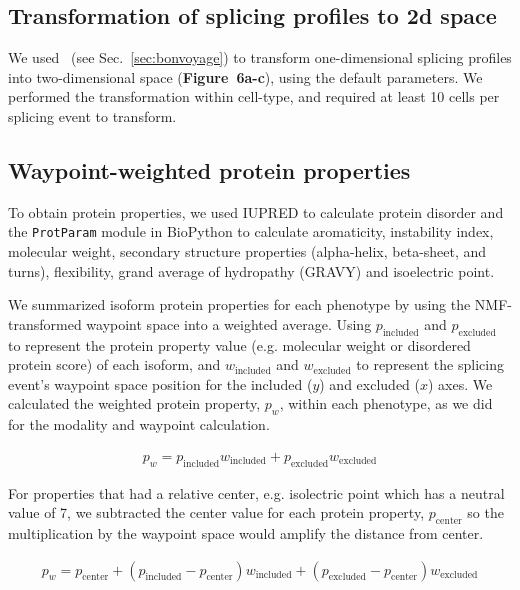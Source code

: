 \subsection{Transformation of splicing profiles to 2d space}

We used \bonvoyage\, (see Sec.~\ref{sec:bonvoyage}) to transform one-dimensional splicing profiles into two-dimensional space (\textbf{Figure~6a-c}), using the default parameters. We performed the transformation within cell-type, and required at least 10 cells per splicing event to transform.

\subsection{Waypoint-weighted protein properties}

To obtain protein properties, we used IUPRED\cite{Dosztanyi:2005gq} to calculate protein disorder and the \texttt{ProtParam} module in BioPython\cite{Cock:2009hj} to calculate aromaticity, instability index, molecular weight, secondary structure properties (alpha-helix, beta-sheet, and turns), flexibility, grand average of hydropathy (GRAVY) and isoelectric point.



We summarized isoform protein properties for each phenotype by using the NMF-transformed waypoint space into a weighted average. Using $p_{\text{included}}$ and $p_{\text{excluded}}$ to represent the protein property value (e.g. molecular weight or disordered protein score) of each isoform, and $w_{\text{included}}$ and $w_{\text{excluded}}$ to represent the splicing event's waypoint space position for the included ($y$) and excluded ($x$) axes. We calculated the weighted protein property, $p_w$, within each phenotype, as we did for the modality and waypoint calculation.

\begin{align}
p_w = p_{\text{included}} w_{\text{included}} + p_{\text{excluded}} w_{\text{excluded}}
\end{align}

For properties that had a relative center, e.g. isolectric point which has a neutral value of 7, we subtracted the center value for each protein property, $p_{\text{center}}$ so the multiplication by the waypoint space would amplify the distance from center.

\begin{align}
p_w = p_{\text{center}} + (p_{\text{included}} - p_{\text{center}}) w_{\text{included}} + (p_{\text{excluded}} - p_{\text{center}}) w_{\text{excluded}} 
\end{align}

